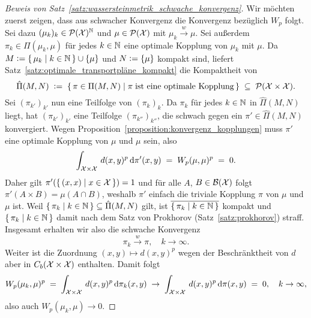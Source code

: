 \documentclass[../thesis/thesis.tex]{subfiles}
\begin{document}
\begin{proof}[Beweis von Satz~\ref{satz:wassersteinmetrik_schwache_konvergenz}]
		Wir möchten zuerst zeigen, dass aus schwacher Konvergenz die Konvergenz bezüglich $W_p$ folgt. Sei dazu $(\mu_k)_k \in \mathcal{P}(\mathcal{X})^{\mathbb{N}}$ und $\mu \in \mathcal{P}(\mathcal{X})$ mit $\mu_k \xrightarrow{w} \mu$. Sei außerdem $\pi_k \in \Pi(\mu_k, \mu)$ 
		für jedes $k \in \mathbb{N}$ eine optimale Kopplung von $\mu_k$ mit $\mu$. 
		Da $M \vcentcolon = \left\{\, \mu_k \; \middle| \; k \in \mathbb{N} \,\right\} \cup \left\{\mu\right\}$ und $N \vcentcolon = \left\{\mu\right\}$ kompakt sind, liefert Satz~\ref{satz:optimale_transportpläne_kompakt} die Kompaktheit von
		\[ \hat{\Pi}(M, N) \; \vcentcolon = \; \left\{\, \pi \in \Pi(M, N) \; \middle| \; \pi \; \text{ist eine optimale Kopplung} \,\right\} \; \subseteq \; \mathcal{P}(\mathcal{X} \times \mathcal{X}) \text{.} \]
		Sei $(\pi_{k'})_{k'}$ nun eine Teilfolge von $(\pi_k)_k$. Da $\pi_k$ für jedes $k \in \mathbb{N}$ in $\hat{\Pi}(M, N)$ liegt, hat $(\pi_{k'})_{k'}$ eine Teilfolge $(\pi_{k''})_{k''}$, 
		die schwach gegen ein $\pi' \in \hat{\Pi}(M, N)$ konvergiert. Wegen Proposition~\ref{proposition:konvergenz_kopplungen} muss $\pi'$ eine optimale Kopplung von $\mu$ und $\mu$ sein, also
		\[ \int_{\mathcal{X} \times \mathcal{X}} \, d(x, y)^p \, \mathrm{d}\pi'(x, y) \; = \; W_p(\mu, \mu)^p \; = \; 0 \text{.} \]
		Daher gilt $\pi'(\left\{\, (x, x) \; \middle| \; x \in \mathcal{X} \,\right\}) = 1$ und für alle $A$, $B \in \mathcal{B}(\mathcal{X})$ folgt $\pi'(A \times B) = \mu(A \cap B)$, weshalb $\pi'$ einfach die 
		triviale Kopplung $\pi$ von $\mu$ und $\mu$ ist. Weil $\left\{\, \pi_k \; \middle| \; k \in \mathbb{N} \,\right\} \subseteq \hat{\Pi}(M, N)$ gilt, ist $\overline{\left\{\, \pi_k \; \middle| \; k \in \mathbb{N} \,\right\}}$ kompakt und $\left\{\, \pi_k \; \middle| \; k \in \mathbb{N} \,\right\}$ damit nach
		dem Satz von Prokhorov (Satz~\ref{satz:prokhorov}) straff. Insgesamt erhalten wir also die schwache Konvergenz
		\[ \pi_k \xrightarrow{w} \pi, \quad k \to \infty \text{.} \] 
		Weiter ist die Zuordnung $(x, y) \mapsto d(x, y)^p$ wegen der Beschränktheit von $d$ aber in $C_b(\mathcal{X} \times \mathcal{X})$ enthalten. Damit folgt 
		\[ W_p(\mu_k, \mu)^p \; = \; \int_{\mathcal{X} \times \mathcal{X}} \, d(x, y)^p \, \mathrm{d}\pi_k(x, y) \; \to \; \int_{\mathcal{X} \times \mathcal{X}} \, d(x, y)^p \, \mathrm{d}\pi(x, y) \; = \; 0, \quad k \to \infty \text{,} \]
		also auch $W_p(\mu_k, \mu) \to 0$.
		

\end{proof}
\end{document}
